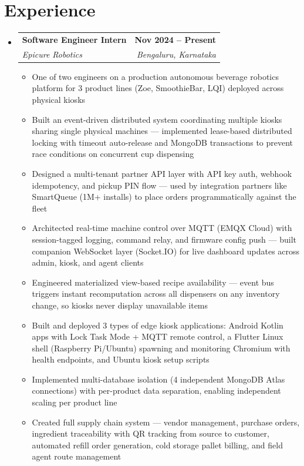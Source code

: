 \documentclass[letterpaper,11pt]{article}
\makeatletter
\newcommand{\resumeItem}[1]{
  \item\footnotesize{
    {#1 \vspace{-3pt}}
  }
}
\newcommand{\resumeSubheading}[4]{
  \vspace{-2pt}\item
    \begin{tabular*}{1.0\textwidth}[t]{l@{\extracolsep{\fill}}r}
      \textbf{#1} & \textbf{\small #2} \\
      \textit{\small#3} & \textit{\small #4} \\
    \end{tabular*}\vspace{-7pt}
}
\newcommand{\resumeSubHeadingListStart}{\begin{itemize}[leftmargin=0.0in, label={}]}
\newcommand{\resumeSubHeadingListEnd}{\end{itemize}}
\newcommand{\resumeItemListStart}{\begin{itemize}}
\newcommand{\resumeItemListEnd}{\end{itemize}\vspace{-7pt}}
\makeatother
\begin{document}
\section{Experience}
  \resumeSubHeadingListStart
    \resumeSubheading
      {Software Engineer Intern}{Nov 2024 -- Present}
      {Epicure Robotics}{Bengaluru, Karnataka}
      \resumeItemListStart
          \resumeItem{One of two engineers on a production autonomous beverage robotics platform for 3 product lines (Zoe, SmoothieBar, LQI) deployed across physical kiosks}
          \resumeItem{Built an event-driven distributed system coordinating multiple kiosks sharing single physical machines --- implemented lease-based distributed locking with timeout auto-release and MongoDB transactions to prevent race conditions on concurrent cup dispensing}
          \resumeItem{Designed a multi-tenant partner API layer with API key auth, webhook idempotency, and pickup PIN flow --- used by integration partners like SmartQueue (1M+ installs) to place orders programmatically against the fleet}
          \resumeItem{Architected real-time machine control over MQTT (EMQX Cloud) with session-tagged logging, command relay, and firmware config push --- built companion WebSocket layer (Socket.IO) for live dashboard updates across admin, kiosk, and agent clients}
          \resumeItem{Engineered materialized view-based recipe availability --- event bus triggers instant recomputation across all dispensers on any inventory change, so kiosks never display unavailable items}
          \resumeItem{Built and deployed 3 types of edge kiosk applications: Android Kotlin apps with Lock Task Mode + MQTT remote control, a Flutter Linux shell (Raspberry Pi/Ubuntu) spawning and monitoring Chromium with health endpoints, and Ubuntu kiosk setup scripts}
          \resumeItem{Implemented multi-database isolation (4 independent MongoDB Atlas connections) with per-product data separation, enabling independent scaling per product line}
          \resumeItem{Created full supply chain system --- vendor management, purchase orders, ingredient traceability with QR tracking from source to customer, automated refill order generation, cold storage pallet billing, and field agent route management}
        \resumeItemListEnd
  \resumeSubHeadingListEnd
\vspace{-16pt}

\end{document}
